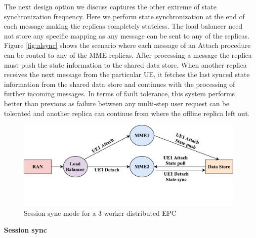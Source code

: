 \documentclass[hidelinks]{report}
\begin{document}
The next design option we discuss captures the other extreme of state synchronization frequency. Here we perform state synchronization at the end of each message making the replicas completely stateless. The load balancer need not store any specific mapping as any message can be sent to any of the replicas. Figure \ref{fig:alsync} shows the scenario where each message of an Attach procedure can be routed to any of the MME replicas. After processing a message the replica must push the state information to the shared data store. When another replica receives the next message from the particular UE, it fetches the last synced state information from the shared data store and continues with the processing of further incoming messages. In terms  of fault tolerance, this system performs better than previous as failure between any multi-step user request can be tolerated and another replica can continue from where the offline replica left out.  


\begin{figure}[H]
\centering
\includegraphics[scale=0.45]{images/session.pdf}
\caption{Session sync mode for a 3 worker distributed EPC}
\label{fig:sessync}
\end{figure}
\noindent\textbf{Session sync}
\end{document}
